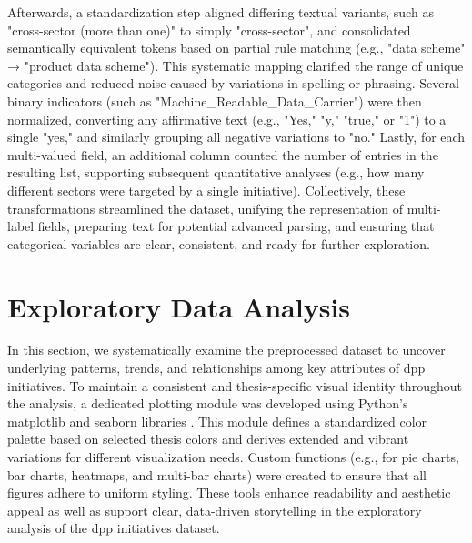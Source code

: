 Afterwards, a standardization step aligned differing textual variants, such as "cross-sector (more than one)" to simply "cross-sector", and consolidated semantically equivalent tokens based on partial rule matching (e.g., "data scheme" → "product data scheme"). This systematic mapping clarified the range of unique categories and reduced noise caused by variations in spelling or phrasing. Several binary indicators (such as "Machine\_Readable\_Data\_Carrier") were then normalized, converting any affirmative text (e.g., "Yes," "y," "true," or "1") to a single "yes," and similarly grouping all negative variations to "no." Lastly, for each multi-valued field, an additional column counted the number of entries in the resulting list, supporting subsequent quantitative analyses (e.g., how many different sectors were targeted by a single initiative). Collectively, these transformations streamlined the dataset, unifying the representation of multi-label fields, preparing text for potential advanced parsing, and ensuring that categorical variables are clear, consistent, and ready for further exploration.

\section{Exploratory Data Analysis}
\label{sec:data_analysis}

In this section, we systematically examine the preprocessed dataset to uncover underlying patterns, trends, and relationships among key attributes of \ac{dpp} initiatives. To maintain a consistent and thesis-specific visual identity throughout the analysis, a dedicated plotting module was developed using Python's matplotlib and seaborn libraries \autocite{PythonSoftwareFoundation.n.d.}. This module defines a standardized color palette based on selected thesis colors and derives extended and vibrant variations for different visualization needs. Custom functions (e.g., for pie charts, bar charts, heatmaps, and multi-bar charts) were created to ensure that all figures adhere to uniform styling. These tools enhance readability and aesthetic appeal as well as support clear, data-driven storytelling in the exploratory analysis of the \ac{dpp} initiatives dataset.

